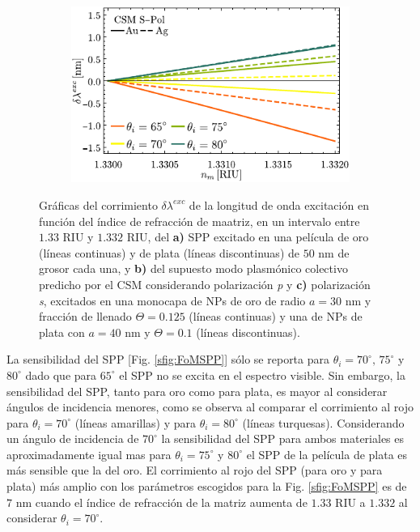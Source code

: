 \begin{figure}[h!]
	\begin{subfigure}{.45\linewidth}\centering
	\includegraphics[scale=1]{2-Resultados/figs/11-SPPCSM/6_Sens_h20_CSMS.pdf}\end{subfigure}\vspace*{-.5em}
	\caption{Gráficas del corrimiento $\delta\lambda^{exc}$ de la longitud de onda excitación  en función del índice de refracción de maatriz, en un intervalo entre $1.33$ RIU y $1.332$ RIU, del \textbf{a)} SPP excitado en una película de oro (líneas continuas) y de plata (líneas discontinuas) de $50$ nm de grosor cada una, y  \textbf{b)} del supuesto modo  plasmónico colectivo predicho por el CSM considerando polarización \emph{p} y \textbf{c)}  polarización \emph{s}, excitados en una monocapa de NPs de oro de radio $a=30$ nm y fracción de llenado $\Theta=0.125$ (líneas continuas) y una de NPs de plata con $a=40$ nm y $\Theta=0.1$ (líneas discontinuas).}\label{fig:FoMSPPCSM}
	\end{figure}	

La sensibilidad del SPP [Fig. \ref{sfig:FoMSPP}] sólo se reporta para $\theta_i=70^\circ,\, 75^\circ$ y $80^\circ$ dado que para $65^\circ$ el SPP no se excita en el espectro visible. Sin embargo, la sensibilidad del SPP, tanto para oro como para plata, es mayor al considerar ángulos de incidencia  menores, como se observa al comparar el corrimiento al rojo para $\theta_i=70^\circ$ (líneas amarillas) y  para $\theta_i=80^\circ$ (líneas turquesas).  Considerando un ángulo de incidencia de $70^\circ$ la sensibilidad del SPP para ambos materiales es aproximadamente igual mas para $\theta_i=75^\circ$ y $80^\circ$ el SPP de la película de plata es más sensible que la del oro. El corrimiento al rojo del SPP (para oro y para plata) más amplio con los parámetros escogidos para la Fig. \ref{sfig:FoMSPP} es de $7$ nm cuando el índice de refracción de la matriz  aumenta de $1.33$ RIU a $1.332$ al considerar $\theta_i=70^\circ$.

